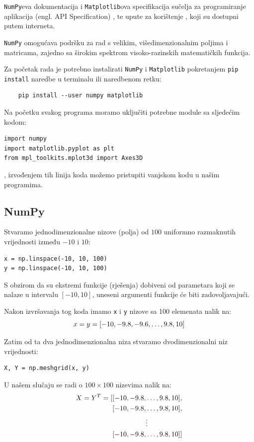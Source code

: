 \verb|NumPy|eva dokumentacija\cite{numpy_doc} i \verb|Matplotlib|ova specifikacija sučelja za programiranje aplikacija (engl. API Specification) \cite{mpl_api}, te upute za korištenje \cite{mpl_ug}, koji su dostupni putem interneta.

\verb|NumPy| omogućava podršku za rad s velikim, višedimenzionalnim poljima i matricama, zajedno sa širokim spektrom visoko-razinskih matematičkih funkcija.\par

Za početak rada je potrebno instalirati \verb|NumPy| i \verb|Matplotlib| pokretanjem \verb|pip install| naredbe u terminalu ili naredbenom retku:
\begin{verbatim}
    pip install --user numpy matplotlib
\end{verbatim}

Na početku svakog programa moramo uključiti potrebne module sa sljedećim kodom\cite[][naslov 5.4.2. Submodules]{py_lang_ref}:
\begin{verbatim}
import numpy
import matplotlib.pyplot as plt
from mpl_toolkits.mplot3d import Axes3D
\end{verbatim}
, izvođenjem tih linija koda možemo pristupiti vanjskom kodu u našim programima.

\subsection{NumPy}

Stvaramo jednodimenzionalne nizove (polja) od $100$ uniformno razmaknutih vrijednosti između $-10$ i $10$:
\begin{verbatim}
x = np.linspace(-10, 10, 100)
y = np.linspace(-10, 10, 100)
\end{verbatim}
S obzirom da su ekstremi funkcije (rješenja) dobiveni od parametara koji se nalaze u intervalu $[-10, 10]$, uneseni argumenti funkcije će biti zadovoljavajući.\par
Nakon izvršavanja tog koda imamo \verb|x| i \verb|y| nizove sa 100 elemenata nalik na:
$$
    x = y = [-10,\space-9.8,\space-9.6,\dots,\space9.8,\space10]
$$

Zatim od ta dva jednodimenzionalna niza stvaramo dvodimenzionalni niz vrijednosti:
\begin{verbatim}
X, Y = np.meshgrid(x, y)
\end{verbatim}
U našem slučaju se radi o $100\times100$ nizevima nalik na:
\begin{align*}
    X = Y^T = [&[-10,\space-9.8,\dots,\space9.8,\space10],\\
    &[-10,\space-9.8,\dots,\space9.8,\space10],\\
    &\hspace*{0.14\linewidth}\vdots\\
    &[-10,\space-9.8,\dots,\space9.8,\space10]]
\end{align*}

